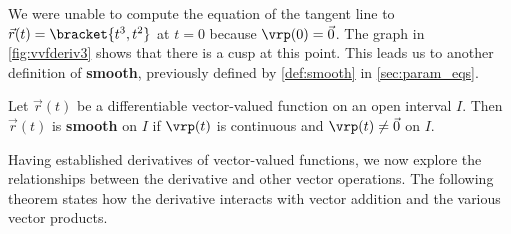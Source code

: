 
We were unable to compute the equation of the tangent line to $\vec r(t)=\bracket{t^3,t^2}$ at $t=0$ because $\vrp(0) = \vec 0$. The graph in \autoref{fig:vvfderiv3} shows that there is a cusp at this point. This leads us to another definition of \textbf{smooth}, previously defined by \autoref{def:smooth} in \autoref{sec:param_eqs}.

\begin{definition}\label{def:vector_smooth}%
Let $\vec r(t)$ be a differentiable vector-valued function on an open interval $I$. Then $\vec r(t)$ is \textbf{smooth} on $I$ if $\vrp(t)$ is continuous and $\vrp(t)\neq \vec 0$ on $I$.
\end{definition}

Having established derivatives of vector-valued functions, we now explore the relationships between the derivative and other vector operations. The following theorem states how the derivative interacts with vector addition and the various vector products.


